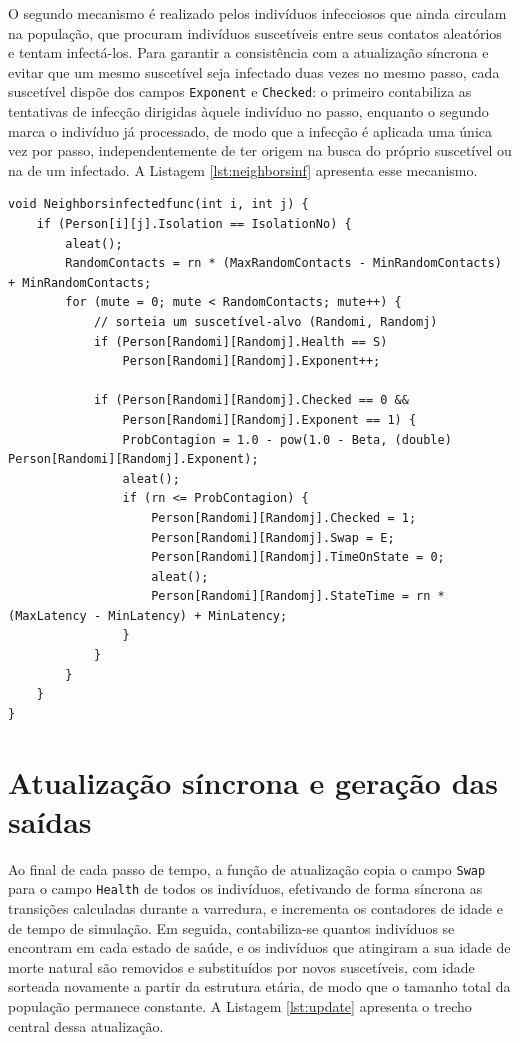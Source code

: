 O segundo mecanismo é realizado pelos indivíduos infecciosos que ainda circulam na população, que procuram indivíduos suscetíveis entre seus contatos aleatórios e tentam infectá-los. Para garantir a consistência com a atualização síncrona e evitar que um mesmo suscetível seja infectado duas vezes no mesmo passo, cada suscetível dispõe dos campos \texttt{Exponent} e \texttt{Checked}: o primeiro contabiliza as tentativas de infecção dirigidas àquele indivíduo no passo, enquanto o segundo marca o indivíduo já processado, de modo que a infecção é aplicada uma única vez por passo, independentemente de ter origem na busca do próprio suscetível ou na de um infectado. A Listagem \ref{lst:neighborsinf} apresenta esse mecanismo.

\begin{lstlisting}[caption={Segundo mecanismo: o infectado busca suscetíveis (\texttt{Neighborsinfectedfunc}).}, label={lst:neighborsinf}]
void Neighborsinfectedfunc(int i, int j) {
    if (Person[i][j].Isolation == IsolationNo) {
        aleat();
        RandomContacts = rn * (MaxRandomContacts - MinRandomContacts) + MinRandomContacts;
        for (mute = 0; mute < RandomContacts; mute++) {
            // sorteia um suscetível-alvo (Randomi, Randomj)
            if (Person[Randomi][Randomj].Health == S)
                Person[Randomi][Randomj].Exponent++;

            if (Person[Randomi][Randomj].Checked == 0 &&
                Person[Randomi][Randomj].Exponent == 1) {
                ProbContagion = 1.0 - pow(1.0 - Beta, (double) Person[Randomi][Randomj].Exponent);
                aleat();
                if (rn <= ProbContagion) {
                    Person[Randomi][Randomj].Checked = 1;
                    Person[Randomi][Randomj].Swap = E;
                    Person[Randomi][Randomj].TimeOnState = 0;
                    aleat();
                    Person[Randomi][Randomj].StateTime = rn * (MaxLatency - MinLatency) + MinLatency;
                }
            }
        }
    }
}
\end{lstlisting}

\section{Atualização síncrona e geração das saídas}

Ao final de cada passo de tempo, a função de atualização copia o campo \texttt{Swap} para o campo \texttt{Health} de todos os indivíduos, efetivando de forma síncrona as transições calculadas durante a varredura, e incrementa os contadores de idade e de tempo de simulação. Em seguida, contabiliza-se quantos indivíduos se encontram em cada estado de saúde, e os indivíduos que atingiram a sua idade de morte natural são removidos e substituídos por novos suscetíveis, com idade sorteada novamente a partir da estrutura etária, de modo que o tamanho total da população permanece constante. A Listagem \ref{lst:update} apresenta o trecho central dessa atualização.

